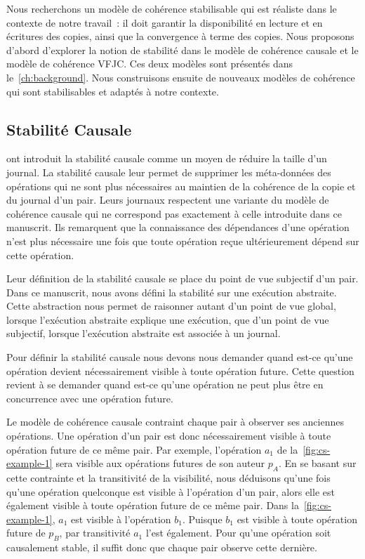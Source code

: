 Nous recherchons un modèle de cohérence stabilisable qui est réaliste dans le contexte de notre travail~: il doit garantir la disponibilité en lecture et en écritures des copies, ainsi que la convergence à terme des copies.
Nous proposons d'abord d'explorer la notion de stabilité dans le modèle de cohérence causale et le modèle de cohérence \acl{VFJC}.
Ces deux modèles sont présentés dans le~\autoref{ch:background}.
Nous construisons ensuite de nouveaux modèles de cohérence qui sont stabilisables et adaptés à notre contexte.


\subsection{Stabilité Causale}\label{subsec:cs}

\textcite{baquero_2018_pure-op-crdt} ont introduit la stabilité causale comme un moyen de réduire la taille d'un journal.
La stabilité causale leur permet de supprimer les méta-données des opérations qui ne sont plus nécessaires au maintien de la cohérence de la copie et du journal d'un pair.
Leurs journaux respectent une variante du modèle de cohérence causale qui ne correspond pas exactement à celle introduite dans ce manuscrit.
Ils remarquent que la connaissance des dépendances d'une opération n'est plus nécessaire une fois que toute opération reçue ultérieurement dépend sur cette opération.

Leur définition de la stabilité causale se place du point de vue subjectif d'un pair.
Dans ce manuscrit, nous avons défini la stabilité sur une exécution abstraite.
Cette abstraction nous permet de raisonner autant d'un point de vue global, lorsque l'exécution abstraite explique une exécution, que d'un point de vue subjectif, lorsque l'exécution abstraite est associée à un journal.

Pour définir la stabilité causale nous devons nous demander quand est-ce qu'une opération devient nécessairement visible à toute opération future.
Cette question revient à se demander quand est-ce qu'une opération ne peut plus être en concurrence avec une opération future.

Le modèle de cohérence causale contraint chaque pair à observer ses anciennes opérations.
Une opération d'un pair est donc nécessairement visible à toute opération future de ce même pair.
Par exemple, l'opération $a_1$ de la~\autoref{fig:cs-example-1} sera visible aux opérations futures de son auteur $p_A$.
En se basant sur cette contrainte et la transitivité de la visibilité, nous déduisons qu'une fois qu'une opération quelconque est visible à l'opération d'un pair, alors elle est également visible à toute opération future de ce même pair.
Dans la~\autoref{fig:cs-example-1}, $a_1$ est visible à l'opération $b_1$.
Puisque $b_1$ est visible à toute opération future de $p_B$, par transitivité $a_1$ l'est également.
Pour qu'une opération soit causalement stable, il suffit donc que chaque pair observe cette dernière.

